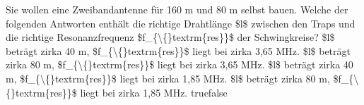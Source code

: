     {Sie wollen eine Zweibandantenne für 160 m und 80 m selbst bauen. Welche der folgenden Antworten enthält die richtige Drahtlänge \$l\$ zwischen den Traps und die richtige Resonanzfrequenz \$f\_\{\textbackslash\{\}textrm\{res\}\}\$ der Schwingkreise?}
    {\$l\$ beträgt zirka 40 m, \$f\_\{\textbackslash\{\}textrm\{res\}\}\$ liegt bei zirka 3,65 MHz.}
    {\$l\$ beträgt zirka 80 m, \$f\_\{\textbackslash\{\}textrm\{res\}\}\$ liegt bei zirka 3,65 MHz.}
    {\$l\$ beträgt zirka 40 m, \$f\_\{\textbackslash\{\}textrm\{res\}\}\$ liegt bei zirka 1,85 MHz.}
    {\$l\$ beträgt zirka 80 m, \$f\_\{\textbackslash\{\}textrm\{res\}\}\$ liegt bei zirka 1,85 MHz.}
    {true}{false}